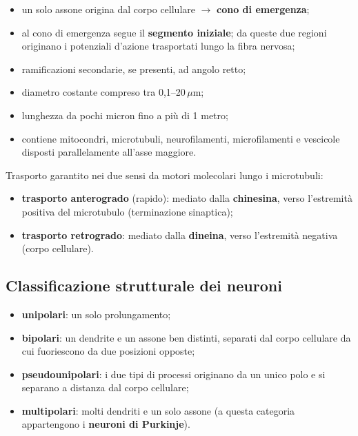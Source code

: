 \begin{itemize}
  \item un solo assone origina dal corpo cellulare $\rightarrow$ \textbf{cono di emergenza};
  \item al cono di emergenza segue il \textbf{segmento iniziale}; da queste due regioni originano i potenziali d'azione trasportati lungo la fibra nervosa;
  \item ramificazioni secondarie, se presenti, ad angolo retto;
  \item diametro costante compreso tra 0,1--20\,$\mu$m;
  \item lunghezza da pochi micron fino a più di 1 metro;
  \item contiene mitocondri, microtubuli, neurofilamenti, microfilamenti e vescicole disposti parallelamente all'asse maggiore.
\end{itemize}

Trasporto garantito nei due sensi da motori molecolari lungo i microtubuli:
\begin{itemize}
  \item \textbf{trasporto anterogrado} (rapido): mediato dalla \textbf{chinesina}, verso l'estremità positiva del microtubulo (terminazione sinaptica);
  \item \textbf{trasporto retrogrado}: mediato dalla \textbf{dineina}, verso l'estremità negativa (corpo cellulare).
\end{itemize}

\subsection{Classificazione strutturale dei neuroni}

\begin{itemize}
  \item \textbf{unipolari}: un solo prolungamento;
  \item \textbf{bipolari}: un dendrite e un assone ben distinti, separati dal corpo cellulare da cui fuoriescono da due posizioni opposte;
  \item \textbf{pseudounipolari}: i due tipi di processi originano da un unico polo e si separano a distanza dal corpo cellulare;
  \item \textbf{multipolari}: molti dendriti e un solo assone (a questa categoria appartengono i \textbf{neuroni di Purkinje}).
\end{itemize}

